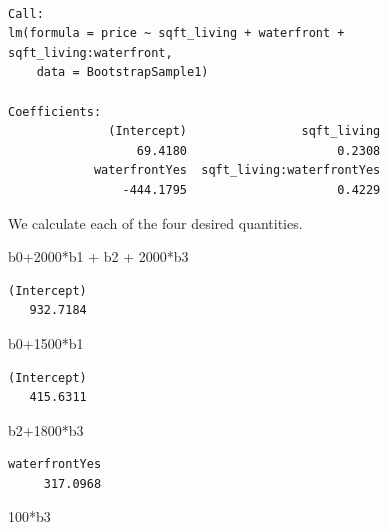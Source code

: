 \documentclass[
  letterpaper,
  DIV=11,
  numbers=noendperiod]{scrreprt}
\newenvironment{Shaded}{\begin{snugshade}}{\end{snugshade}}
\newcommand{\DecValTok}[1]{\textcolor[rgb]{0.68,0.00,0.00}{#1}}
\newcommand{\NormalTok}[1]{\textcolor[rgb]{0.00,0.23,0.31}{#1}}
\newcommand{\SpecialCharTok}[1]{\textcolor[rgb]{0.37,0.37,0.37}{#1}}
\begin{document}
\begin{verbatim}

Call:
lm(formula = price ~ sqft_living + waterfront + sqft_living:waterfront, 
    data = BootstrapSample1)

Coefficients:
              (Intercept)                sqft_living  
                  69.4180                     0.2308  
            waterfrontYes  sqft_living:waterfrontYes  
                -444.1795                     0.4229  
\end{verbatim}

We calculate each of the four desired quantities.

\begin{Shaded}
\begin{Highlighting}[]
\NormalTok{b0}\SpecialCharTok{+}\DecValTok{2000}\SpecialCharTok{*}\NormalTok{b1 }\SpecialCharTok{+}\NormalTok{ b2 }\SpecialCharTok{+} \DecValTok{2000}\SpecialCharTok{*}\NormalTok{b3}
\end{Highlighting}
\end{Shaded}

\begin{verbatim}
(Intercept) 
   932.7184 
\end{verbatim}

\begin{Shaded}
\begin{Highlighting}[]
\NormalTok{b0}\SpecialCharTok{+}\DecValTok{1500}\SpecialCharTok{*}\NormalTok{b1}
\end{Highlighting}
\end{Shaded}

\begin{verbatim}
(Intercept) 
   415.6311 
\end{verbatim}

\begin{Shaded}
\begin{Highlighting}[]
\NormalTok{b2}\SpecialCharTok{+}\DecValTok{1800}\SpecialCharTok{*}\NormalTok{b3}
\end{Highlighting}
\end{Shaded}

\begin{verbatim}
waterfrontYes 
     317.0968 
\end{verbatim}

\begin{Shaded}
\begin{Highlighting}[]
\DecValTok{100}\SpecialCharTok{*}\NormalTok{b3}
\end{Highlighting}
\end{Shaded}
\end{document}
